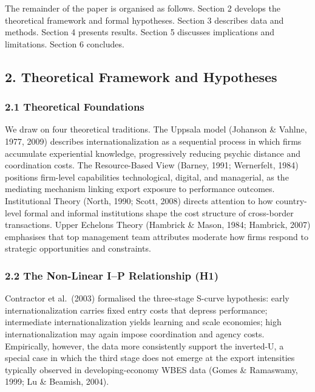 \documentclass[
  12pt,a4paper]{article}
\begin{document}
The remainder of the paper is organised as follows. Section 2 develops
the theoretical framework and formal hypotheses. Section 3 describes
data and methods. Section 4 presents results. Section 5 discusses
implications and limitations. Section 6 concludes.

\hypertarget{theoretical-framework-and-hypotheses}{%
\subsection{2. Theoretical Framework and
Hypotheses}\label{theoretical-framework-and-hypotheses}}

\hypertarget{theoretical-foundations}{%
\subsubsection{2.1 Theoretical
Foundations}\label{theoretical-foundations}}

We draw on four theoretical traditions. The Uppsala model (Johanson \&
Vahlne, 1977, 2009) describes internationalization as a sequential
process in which firms accumulate experiential knowledge, progressively
reducing psychic distance and coordination costs. The Resource-Based
View (Barney, 1991; Wernerfelt, 1984) positions firm-level capabilities
technological, digital, and managerial, as the mediating mechanism
linking export exposure to performance outcomes. Institutional Theory
(North, 1990; Scott, 2008) directs attention to how country-level formal
and informal institutions shape the cost structure of cross-border
transactions. Upper Echelons Theory (Hambrick \& Mason, 1984; Hambrick,
2007) emphasises that top management team attributes moderate how firms
respond to strategic opportunities and constraints.

\hypertarget{the-non-linear-ip-relationship-h1}{%
\subsubsection{2.2 The Non-Linear I--P Relationship
(H1)}\label{the-non-linear-ip-relationship-h1}}

Contractor et al.~(2003) formalised the three-stage S-curve hypothesis:
early internationalization carries fixed entry costs that depress
performance; intermediate internationalization yields learning and scale
economies; high internationalization may again impose coordination and
agency costs. Empirically, however, the data more consistently support
the inverted-U, a special case in which the third stage does not emerge
at the export intensities typically observed in developing-economy WBES
data (Gomes \& Ramaswamy, 1999; Lu \& Beamish, 2004).
\end{document}

